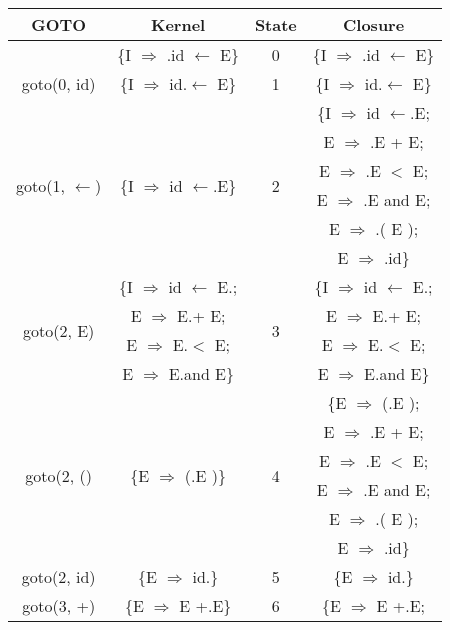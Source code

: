 \begin{table}[!ht]
  \hspace{-1.4cm}
  \begin{minipage}[t]{.4\linewidth}
    \centering
    \begin{tabular}{|c|c|c|c|}
      \hline
      GOTO & Kernel & State & Closure\\
      \hline
      &	\{I $\Rightarrow$ .id $\leftarrow$ E\} & 0 & \{I $\Rightarrow$ .id $\leftarrow$ E\}\\
      \hline
      goto(0, id)	& \{I $\Rightarrow$ id.$\leftarrow$ E\} &	1	&	\{I $\Rightarrow$ id.$\leftarrow$ E\}\\
      \hline
      \multirow{6}{*}{goto(1, $\leftarrow$)} & \multirow{6}{*}{\{I $\Rightarrow$ id $\leftarrow$.E\}} & \multirow{6}{*}{2} & \{I $\Rightarrow$ id $\leftarrow$.E;\\
      & & & E $\Rightarrow$ .E + E;\\
      & & & E $\Rightarrow$ .E $<$ E;\\
      & & & E $\Rightarrow$ .E and E;\\
      & & & E $\Rightarrow$ .( E );\\
      & & & E $\Rightarrow$ .id\}\\
      \hline
      \multirow{4}{*}{goto(2, E)} & \{I $\Rightarrow$ id $\leftarrow$ E.; & \multirow{4}{*}{3} & \{I $\Rightarrow$ id $\leftarrow$ E.;\\
      & E $\Rightarrow$ E.+ E; & & E $\Rightarrow$ E.+ E; \\
      & E $\Rightarrow$ E.$<$ E; & & E $\Rightarrow$ E.$<$ E; \\
      & E $\Rightarrow$ E.and E\} & & E $\Rightarrow$ E.and E\} \\
      \hline
      \multirow{6}{*}{goto(2, ()} & \multirow{6}{*}{\{E $\Rightarrow$ (.E )\}} & \multirow{6}{*}{4}	& \{E $\Rightarrow$ (.E );\\
      & & & E $\Rightarrow$ .E + E;\\
      & & & E $\Rightarrow$ .E $<$ E;\\
      & & & E $\Rightarrow$ .E and E; \\
      & & & E $\Rightarrow$ .( E );\\
      & & & E $\Rightarrow$ .id\}\\
      \hline
      goto(2, id) & \{E $\Rightarrow$ id.\} & 5 & \{E $\Rightarrow$ id.\}\\
      \hline
      \multirow{5}{*}{goto(3, +)} & \multirow{5}{*}{\{E $\Rightarrow$ E +.E\}}	& \multirow{5}{*}{6}	& \{E $\Rightarrow$ E +.E; \\

\end{tabular}
\end{minipage}
\end{table}
